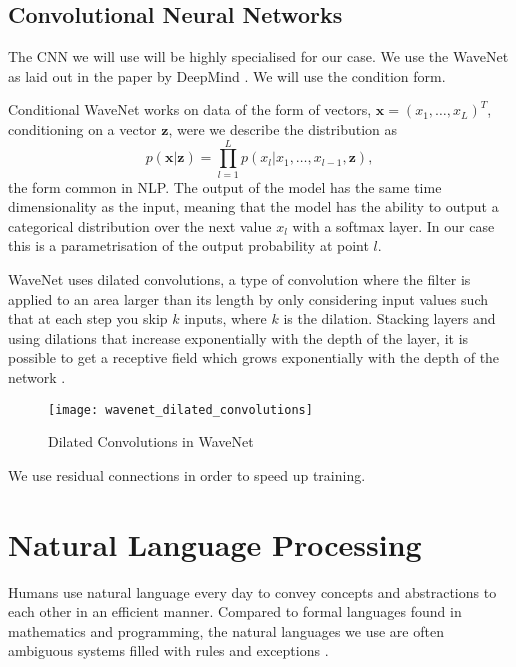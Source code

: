 \subsection{Convolutional Neural Networks}
\label{ch:WaveNet}
The CNN we will use will be highly specialised for our case. We use the WaveNet
as laid out in the paper by DeepMind \cite{DBLP:journals/corr/OordDZSVGKSK16}.
We will use the condition form.

Conditional WaveNet works on data of the form of vectors, $\bm{x} = (x_1, \dots,
x_L)^T$, conditioning on a vector $\bm{z}$, were we describe the distribution as
\begin{equation*}
p(\bm{x} | \bm{z}) = \prod_{l=1}^L p(x_l| x_1, \dots, x_{l-1}, \bm{z}),
\end{equation*}
the form common in NLP. The output of the model has the same
time dimensionality as the input, meaning that the model has the ability to
output a categorical distribution over the next value $x_l$ with a softmax
layer. In our case this is a parametrisation of the output probability at point
$l$.

WaveNet uses dilated convolutions, a type of convolution where the filter is applied
to an area larger than its length by only considering input values such that at
each step you skip $k$ inputs, where $k$ is the dilation. Stacking layers and
using dilations that increase exponentially with the depth of the layer, it is
possible to get a receptive field which grows exponentially with the depth of
the network \cite{DBLP:journals/corr/OordDZSVGKSK16}.

\begin{figure}[H]
  \centering
  \texttt{[image: wavenet\_dilated\_convolutions]}
  \caption{Dilated Convolutions in WaveNet \cite{DBLP:journals/corr/OordDZSVGKSK16}}
  \label{fig:wavenet_dilated_convolutions}
\end{figure}

We use residual connections in order to speed up training.

\section{Natural Language Processing}

Humans use natural language every day to convey concepts and abstractions to each
other in an efficient manner. Compared to formal languages found in
mathematics and programming, the natural languages we use are often
ambiguous systems filled with rules and exceptions \cite{Rosenfeld00twodecades,
  sep-computational-linguistics}.

